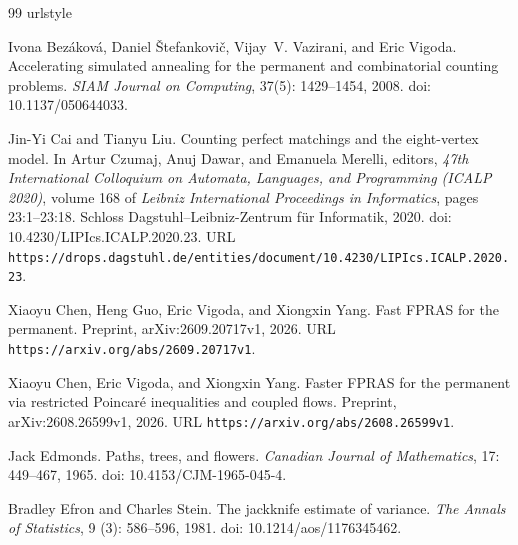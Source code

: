\documentclass[11pt]{article}
\theoremstyle{definition}
\theoremstyle{remark}
\numberwithin{equation}{section}
\begin{document}
\begin{thebibliography}{99}
\providecommand{\natexlab}[1]{#1}
\providecommand{\url}[1]{\texttt{#1}}
\expandafter\ifx\csname urlstyle\endcsname\relax
  \providecommand{\doi}[1]{doi: #1}\else
  \providecommand{\doi}{doi: \begingroup \urlstyle{rm}\Url}\fi

Ivona Bez\'{a}kov\'{a}, Daniel \v{S}tefankovi\v{c}, Vijay~V. Vazirani,
  and Eric Vigoda.
\newblock Accelerating simulated annealing for the permanent and
  combinatorial counting problems.
\newblock \emph{SIAM Journal on Computing}, 37(5):
  1429--1454, 2008.
\newblock \doi{10.1137/050644033}.

Jin-Yi Cai and Tianyu Liu.
\newblock Counting perfect matchings and the eight-vertex model.
\newblock In Artur Czumaj, Anuj Dawar, and Emanuela Merelli, editors,
  \emph{47th International Colloquium on Automata, Languages, and Programming
  (ICALP 2020)}, volume 168 of \emph{Leibniz International Proceedings in
  Informatics}, pages 23:1--23:18. Schloss Dagstuhl--Leibniz-Zentrum f{\"u}r
  Informatik, 2020.
\newblock \doi{10.4230/LIPIcs.ICALP.2020.23}.
\newblock URL
  \url{https://drops.dagstuhl.de/entities/document/10.4230/LIPIcs.ICALP.2020.23}.

Xiaoyu Chen, Heng Guo, Eric Vigoda, and Xiongxin Yang.
\newblock Fast FPRAS for the permanent.
\newblock Preprint, arXiv:2609.20717v1, 2026.
\newblock URL \url{https://arxiv.org/abs/2609.20717v1}.

Xiaoyu Chen, Eric Vigoda, and Xiongxin Yang.
\newblock Faster FPRAS for the permanent via restricted Poincar\'e
  inequalities and coupled flows.
\newblock Preprint, arXiv:2608.26599v1, 2026.
\newblock URL \url{https://arxiv.org/abs/2608.26599v1}.

Jack Edmonds.
\newblock Paths, trees, and flowers.
\newblock \emph{Canadian Journal of Mathematics}, 17: 449--467, 1965.
\newblock \doi{10.4153/CJM-1965-045-4}.

Bradley Efron and Charles Stein.
\newblock The jackknife estimate of variance.
\newblock \emph{The Annals of Statistics}, 9
  (3): 586--596, 1981.
\newblock \doi{10.1214/aos/1176345462}.


\end{thebibliography}
\end{document}

